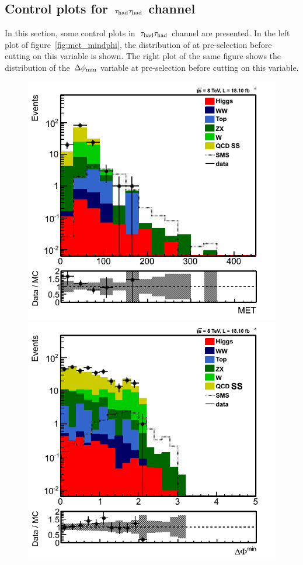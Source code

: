 \subsection{\texorpdfstring{Control plots for $\,\tau_{\rm had}\tau_{\rm had}$ channel}{Control plots for tau-tau channel}}
In this section, some control plots in $\,\tau_{\rm had}\tau_{\rm had}$ channel are presented. In the left plot of figure~\ref{fig:met_mindphi}, the distribution of \MET at pre-selection before cutting on this variable is shown. The right plot of the same figure shows the distribution of the $\,{\Delta\phi_{\rm min}}$ variable at pre-selection before cutting on this variable.
\begin{figure}[!Hhtb]
\centering
\includegraphics[angle=0,scale=0.35]{TauTauFigs/MET2.png}
\includegraphics[angle=0,scale=0.35]{TauTauFigs/DPhimin.png} \\

\end{figure}
